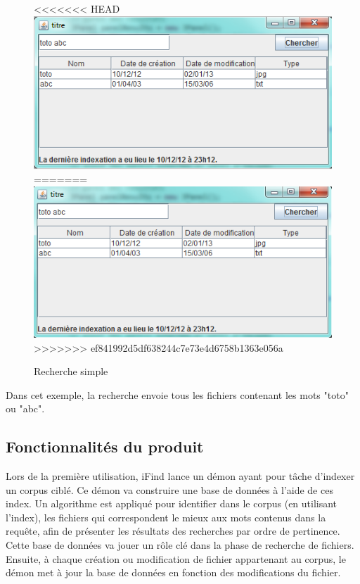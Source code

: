 \documentclass[a4paper,10pt]{report}
\begin{document}
\begin{figure}
<<<<<<< HEAD
\includegraphics[scale=0.5]{figure1.png}
=======
\includegraphics[scale=0.7]{rechercheSimple.png}
>>>>>>> ef841992d5df638244c7e73e4d6758b1363e056a
\caption{Recherche simple}
\end{figure}

Dans cet exemple, la recherche envoie tous les fichiers contenant les mots
"toto" ou "abc".

\subsection{Fonctionnalités du produit}
Lors de la première utilisation, iFind lance un démon ayant pour tâche d’indexer
un corpus ciblé. 
Ce démon va construire une base de données à l’aide de ces index. Un algorithme
est appliqué pour identifier dans le corpus (en utilisant l'index), les fichiers
qui correspondent le mieux aux mots contenus dans la requête, afin de présenter
les résultats des recherches par ordre de pertinence. Cette base de données va
jouer un rôle clé dans la phase de recherche de fichiers.
Ensuite, à chaque création ou modification de fichier appartenant au corpus, le
démon met à jour la base de données en fonction des modifications du fichier.
\end{document}
